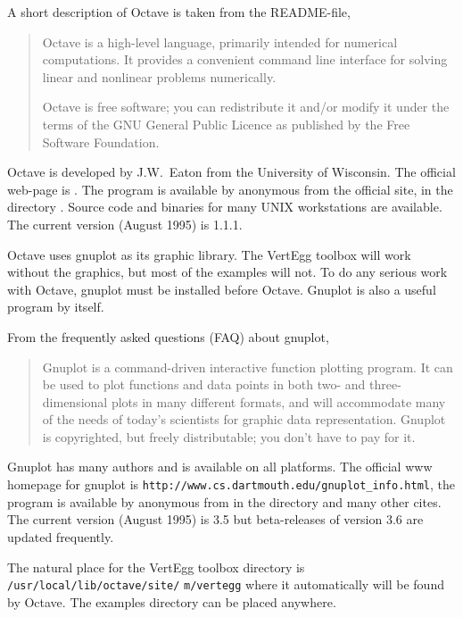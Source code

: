 A short description of Octave is taken from the README-file,
\begin{quotation}
   Octave is a high-level language, primarily intended for
   numerical computations. It provides a convenient command line
   interface for solving linear and nonlinear problems
   numerically. 

   Octave is free software; you can redistribute it and/or modify
   it under the terms of the GNU General Public Licence as
   published by the Free Software Foundation.
\end{quotation}

Octave is developed by J.W.~Eaton from the University of Wisconsin.
The official web-page is .
The program is available by anonymous  from the official
site,  in the directory .
Source code and binaries for many UNIX workstations are available. The
current version (August 1995) is 1.1.1.


Octave uses gnuplot as its graphic library. The VertEgg toolbox
will work without the graphics, but most of the examples will not.
To do any serious work with Octave, gnuplot must be installed before
Octave. Gnuplot is also a useful program by itself.

From the frequently asked questions (FAQ) about gnuplot,
\begin{quotation}
   Gnuplot is a command-driven interactive function plotting
   program. It can be used to plot functions and data points in
   both two- and three- dimensional plots in many different
   formats, and will accommodate many of the needs of today's
   scientists for graphic data representation. Gnuplot is
   copyrighted, but freely distributable; you don't have to pay
   for it.
\end{quotation}

Gnuplot has many authors and is available on all platforms.
The official www homepage for gnuplot is 
\verb+http:+\verb+//www.cs.+\verb+dartmouth.edu+\verb+/gnuplot_info.html+, the
program is available by anonymous  from
 in the directory  and many
other cites. The current version (August 1995) is 3.5 but
beta-releases of version 3.6 are updated frequently.

The natural place for the VertEgg toolbox directory is
\verb+/usr/local/lib/octave/site/+ \verb+m/vertegg+ where it
automatically will be found by Octave. The examples directory can be
placed anywhere.


